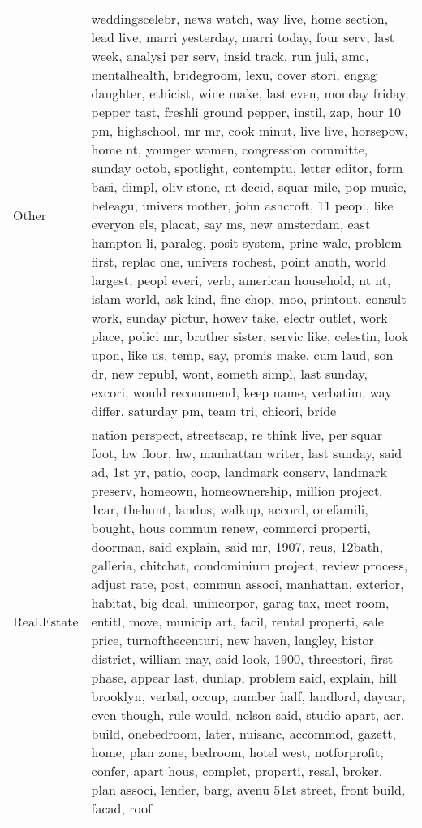 \begin{longtable}{p{}p{}}
  Other & weddingscelebr, news watch, way live, home section, lead live, marri yesterday, marri today, four serv, last week, analysi per serv, insid track, run juli, amc, mentalhealth, bridegroom, lexu, cover stori, engag daughter, ethicist, wine make, last even, monday friday, pepper tast, freshli ground pepper, instil, zap, hour 10 pm, highschool, mr mr, cook minut, live live, horsepow, home nt, younger women, congression committe, sunday octob, spotlight, contemptu, letter editor, form basi, dimpl, oliv stone, nt decid, squar mile, pop music, beleagu, univers mother, john ashcroft, 11 peopl, like everyon els, placat, say ms, new amsterdam, east hampton li, paraleg, posit system, princ wale, problem first, replac one, univers rochest, point anoth, world largest, peopl everi, verb, american household, nt nt, islam world, ask kind, fine chop, moo, printout, consult work, sunday pictur, howev take, electr outlet, work place, polici mr, brother sister, servic like, celestin, look upon, like us, temp, say, promis make, cum laud, son dr, new republ, wont, someth simpl, last sunday, excori, would recommend, keep name, verbatim, way differ, saturday pm, team tri, chicori, bride \\ 
  Real.Estate & nation perspect, streetscap, re think live, per squar foot, hw floor, hw, manhattan writer, last sunday, said ad, 1st yr, patio, coop, landmark conserv, landmark preserv, homeown, homeownership, million project, 1car, thehunt, landus, walkup, accord, onefamili, bought, hous commun renew, commerci properti, doorman, said explain, said mr, 1907, reus, 12bath, galleria, chitchat, condominium project, review process, adjust rate, post, commun associ, manhattan, exterior, habitat, big deal, unincorpor, garag tax, meet room, entitl, move, municip art, facil, rental properti, sale price, turnofthecenturi, new haven, langley, histor district, william may, said look, 1900, threestori, first phase, appear last, dunlap, problem said, explain, hill brooklyn, verbal, occup, number half, landlord, daycar, even though, rule would, nelson said, studio apart, acr, build, onebedroom, later, nuisanc, accommod, gazett, home, plan zone, bedroom, hotel west, notforprofit, confer, apart hous, complet, properti, resal, broker, plan associ, lender, barg, avenu 51st street, front build, facad, roof \\ 

\end{longtable}
